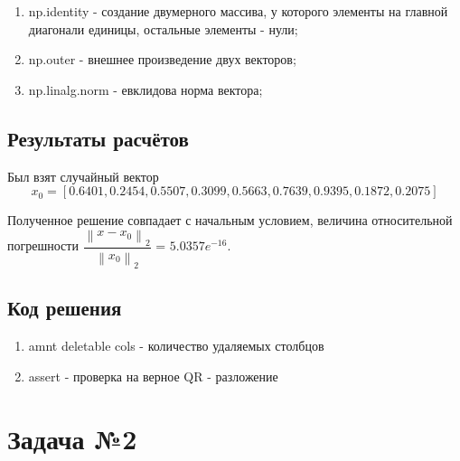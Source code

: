 \documentclass[a4paper]{article}
\begin{document}
\newpage



\begin{enumerate}
\item np.identity - создание двумерного массива, у которого элементы на главной диагонали единицы, остальные элементы - нули;
\item np.outer - внешнее произведение двух векторов;
\item np.linalg.norm - евклидова норма вектора;
\end{enumerate}

\newpage

\subsection{Результаты расчётов}

Был взят случайный вектор
\begin{equation*}
x_0 = [0.6401, 0.2454, 0.5507, 0.3099, 0.5663, 0.7639, 0.9395, 0.1872, 0.2075]
\end{equation*}

Полученное решение совпадает с начальным условием, величина относительной погрешности $\dfrac{\left \| x - x_0 \right \|_{2}} {\left \| x_0 \right \|_{2}}$ = $5.0357e^{-16}$.

\newpage

\subsection{Код решения}





\begin{enumerate}
\item amnt deletable cols - количество удаляемых столбцов
\item assert - проверка на верное QR - разложение
\end{enumerate}

\newpage

\section{Задача №2}
\end{document}
